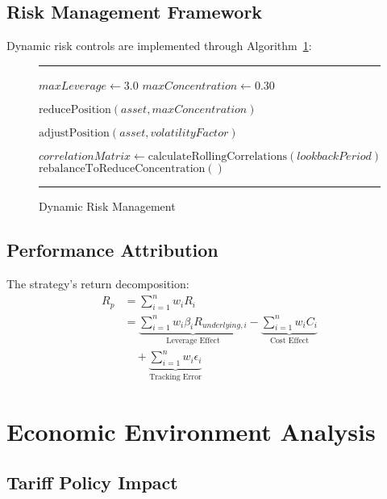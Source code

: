 \documentclass[onecolumn,11pt]{IEEEtran}
\renewenvironment{algorithm}[1][h]
  {\begin{figure}[#1]
   \centering
   \begin{minipage}{0.9\textwidth}
   \hrule
   \vspace{0.3em}}
  {\vspace{0.3em}
   \hrule
   \end{minipage}
   \end{figure}}
\begin{document}
\subsection{Risk Management Framework}

Dynamic risk controls are implemented through Algorithm~\ref{alg:risk}:

\begin{algorithm}[h]
\caption{Dynamic Risk Management}
\label{alg:risk}
\begin{algorithmic}[1]
    \State $maxLeverage \gets 3.0$
    \State $maxConcentration \gets 0.30$
    
            \State $\text{reducePosition}(asset, maxConcentration)$
        \EndIf
        
            \State $\text{adjustPosition}(asset, volatilityFactor)$
        \EndIf
    \EndFor
    
    \State $correlationMatrix \gets \text{calculateRollingCorrelations}(lookbackPeriod)$
        \State $\text{rebalanceToReduceConcentration}()$
    \EndIf
\EndFunction
\end{algorithmic}
\end{algorithm}

\subsection{Performance Attribution}

The strategy's return decomposition:
\begin{align}
R_p &= \sum_{i=1}^n w_i R_i \\
&= \underbrace{\sum_{i=1}^n w_i \beta_i R_{underlying,i}}_{\text{Leverage Effect}} - \underbrace{\sum_{i=1}^n w_i C_i}_{\text{Cost Effect}} \\
&\quad + \underbrace{\sum_{i=1}^n w_i \epsilon_i}_{\text{Tracking Error}}
\end{align}

\section{Economic Environment Analysis}

\subsection{Tariff Policy Impact}
\end{document}
